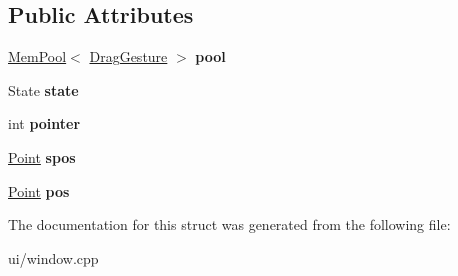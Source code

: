 \subsection*{Public Attributes}
\begin{DoxyCompactItemize}
\item 
\hypertarget{struct_window_1_1_drag_gesture_recognizer_a6857524ea5e940dacbb05e9e67e01496}{\hyperlink{class_tempest_1_1_mem_pool}{Mem\+Pool}$<$ \hyperlink{class_tempest_1_1_drag_gesture}{Drag\+Gesture} $>$ {\bfseries pool}}\label{struct_window_1_1_drag_gesture_recognizer_a6857524ea5e940dacbb05e9e67e01496}

\item 
\hypertarget{struct_window_1_1_drag_gesture_recognizer_ab6f37e7494d80666bb789de20ed856c8}{State {\bfseries state}}\label{struct_window_1_1_drag_gesture_recognizer_ab6f37e7494d80666bb789de20ed856c8}

\item 
\hypertarget{struct_window_1_1_drag_gesture_recognizer_ae8f6bcd31e26ba9916f14c070aac25a6}{int {\bfseries pointer}}\label{struct_window_1_1_drag_gesture_recognizer_ae8f6bcd31e26ba9916f14c070aac25a6}

\item 
\hypertarget{struct_window_1_1_drag_gesture_recognizer_af0f4931d90572a2fe30300d8fb785964}{\hyperlink{struct_tempest_1_1_point}{Point} {\bfseries spos}}\label{struct_window_1_1_drag_gesture_recognizer_af0f4931d90572a2fe30300d8fb785964}

\item 
\hypertarget{struct_window_1_1_drag_gesture_recognizer_acef11d15b3acead1730e0e038457c1ee}{\hyperlink{struct_tempest_1_1_point}{Point} {\bfseries pos}}\label{struct_window_1_1_drag_gesture_recognizer_acef11d15b3acead1730e0e038457c1ee}

\end{DoxyCompactItemize}


The documentation for this struct was generated from the following file\+:\begin{DoxyCompactItemize}
\item 
ui/window.\+cpp\end{DoxyCompactItemize}
